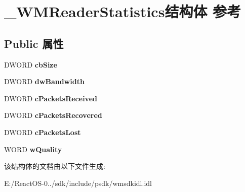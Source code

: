\hypertarget{struct___w_m_reader_statistics}{}\section{\+\_\+\+W\+M\+Reader\+Statistics结构体 参考}
\label{struct___w_m_reader_statistics}
\subsection*{Public 属性}
\begin{DoxyCompactItemize}
\item 
\mbox{\label{struct___w_m_reader_statistics_ac169e4855234e5f217876b02efc53ff8}} 
D\+W\+O\+RD {\bfseries cb\+Size}
\item 
\mbox{\label{struct___w_m_reader_statistics_a628f989e0e364295518a92b532d65a2d}} 
D\+W\+O\+RD {\bfseries dw\+Bandwidth}
\item 
\mbox{\label{struct___w_m_reader_statistics_aec269d01e3a3e7aedb44ee724b7504c9}} 
D\+W\+O\+RD {\bfseries c\+Packets\+Received}
\item 
\mbox{\label{struct___w_m_reader_statistics_a0e7ec177dd24ba814d41344aeb9ba653}} 
D\+W\+O\+RD {\bfseries c\+Packets\+Recovered}
\item 
\mbox{\label{struct___w_m_reader_statistics_ad1121150fbd4ddb96eb957b031c28e33}} 
D\+W\+O\+RD {\bfseries c\+Packets\+Lost}
\item 
\mbox{\label{struct___w_m_reader_statistics_a3ddce5f952ca90a9b242eede1982b47c}} 
W\+O\+RD {\bfseries w\+Quality}
\end{DoxyCompactItemize}


该结构体的文档由以下文件生成\+:\begin{DoxyCompactItemize}
\item 
E\+:/\+React\+O\+S-\/0../sdk/include/psdk/wmsdkidl.\+idl\end{DoxyCompactItemize}
